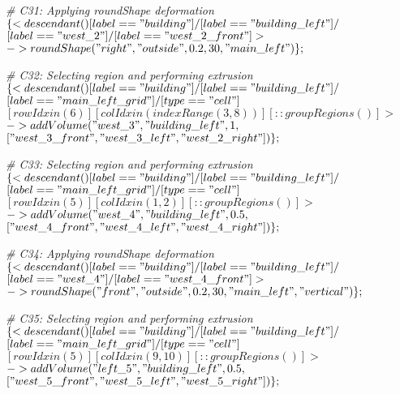 \noindent \textit{\# C31: Applying roundShape deformation} \\
$\{< descendant() [label=="building"] / [label=="building\_left"] / $\\
$[label=="west\_2"] / [label=="west\_2\_front"] > $\\
$-> roundShape("right", "outside", 0.2, 30, "main\_left")\};$

\noindent \textit{\# C32: Selecting region and performing extrusion} \\
$\{< descendant() [label=="building"] / [label=="building\_left"] / $\\
$[label=="main\_left\_grid"] / [type=="cell"] $\\
$[rowIdx in (6)] [colIdx in (indexRange(3, 8))] [::groupRegions()] > $\\
$-> addVolume("west\_3", "building\_left", 1, $\\
$["west\_3\_front", "west\_3\_left", "west\_2\_right"])\};$

\noindent \textit{\# C33: Selecting region and performing extrusion} \\
$\{< descendant() [label=="building"] / [label=="building\_left"] / $\\
$[label=="main\_left\_grid"] / [type=="cell"] $\\
$[rowIdx in (5)] [colIdx in (1, 2)] [::groupRegions()] > $\\
$-> addVolume("west\_4", "building\_left", 0.5, $\\
$["west\_4\_front", "west\_4\_left", "west\_4\_right"])\};$

\noindent \textit{\# C34: Applying roundShape deformation} \\
$\{< descendant() [label=="building"] / [label=="building\_left"] / $\\
$[label=="west\_4"] / [label=="west\_4\_front"] > $\\
$-> roundShape("front", "outside", 0.2, 30, "main\_left", "vertical")\};$

\noindent \textit{\# C35: Selecting region and performing extrusion} \\
$\{< descendant() [label=="building"] / [label=="building\_left"] / $\\
$[label=="main\_left\_grid"] / [type=="cell"] $\\
$[rowIdx in (5)] [colIdx in (9, 10)] [::groupRegions()] > $\\
$-> addVolume("left\_5", "building\_left", 0.5, $\\
$["west\_5\_front", "west\_5\_left", "west\_5\_right"])\};$

